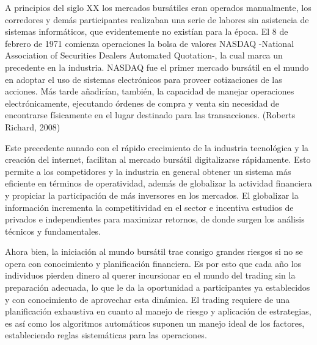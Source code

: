 \documentclass[a4paper,12pt]{Latex/Classes/PhDthesisPSnPDF}
\begin{document}
A principios del siglo XX los mercados bursátiles eran operados manualmente, los corredores y demás participantes realizaban una serie de labores sin asistencia de sistemas informáticos, que evidentemente no existían para la época. El 8 de febrero de 1971 comienza operaciones la bolsa de valores NASDAQ -National Association of Securities Dealers Automated Quotation-, la cual marca un precedente en la industria. NASDAQ fue el primer mercado bursátil en el mundo en adoptar el uso de sistemas electrónicos para proveer cotizaciones de las acciones. Más tarde añadirían, también, la capacidad de manejar operaciones electrónicamente, ejecutando órdenes de compra y venta sin necesidad de encontrarse físicamente en el lugar destinado para las transacciones. (Roberts Richard, 2008)

Este precedente aunado con el rápido crecimiento de la industria tecnológica y la creación del internet, facilitan al mercado bursátil digitalizarse rápidamente. Esto permite a los competidores y la industria en general obtener un sistema más eficiente en términos de operatividad, además de globalizar la actividad financiera y propiciar la participación de más inversores en los mercados. El globalizar la información incrementa la competitividad en el sector e incentiva estudios de privados e independientes para maximizar retornos, de donde surgen los análisis técnicos y fundamentales.

Ahora bien, la iniciación al mundo bursátil trae consigo grandes riesgos si no se opera con conocimiento y planificación financiera. Es por esto que cada año los individuos pierden dinero al querer incursionar en el mundo del trading sin la preparación adecuada, lo que le da la oportunidad a participantes ya establecidos y con conocimiento de aprovechar esta dinámica. El trading requiere de una planificación exhaustiva en cuanto al manejo de riesgo y aplicación de estrategias, es así como los algoritmos automáticos suponen un manejo ideal de los factores, estableciendo reglas sistemáticas para las operaciones.
\end{document}
